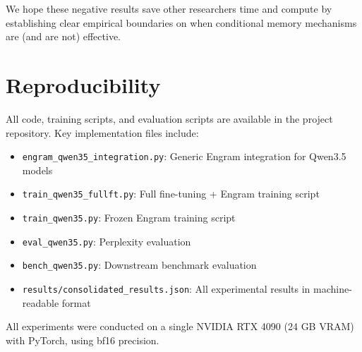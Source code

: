 \documentclass{article}
\begin{document}
We hope these negative results save other researchers time and compute by establishing clear empirical boundaries on when conditional memory mechanisms are (and are not) effective.

\section*{Reproducibility}

All code, training scripts, and evaluation scripts are available in the project repository. Key implementation files include:
\begin{itemize}[nosep]
    \item \texttt{engram\_qwen35\_integration.py}: Generic Engram integration for Qwen3.5 models
    \item \texttt{train\_qwen35\_fullft.py}: Full fine-tuning + Engram training script
    \item \texttt{train\_qwen35.py}: Frozen Engram training script
    \item \texttt{eval\_qwen35.py}: Perplexity evaluation
    \item \texttt{bench\_qwen35.py}: Downstream benchmark evaluation
    \item \texttt{results/consolidated\_results.json}: All experimental results in machine-readable format
\end{itemize}

All experiments were conducted on a single NVIDIA RTX 4090 (24 GB VRAM) with PyTorch, using bf16 precision.


\end{document}
